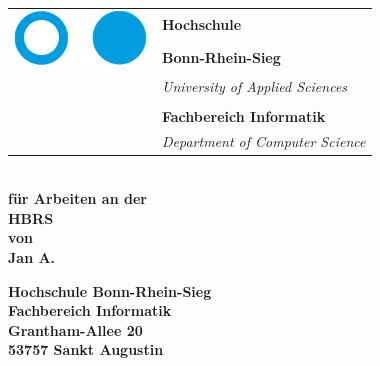 

\begin{titlepage}

    \begin{tabular}{ll}
         \multirow{2}{*}{\includegraphics[scale=0.37]{Bilder/HBRS_Logo_500px.png}} & \textbf{Hochschule}  \\
            & \textbf{Bonn-Rhein-Sieg} \\
            & \textit{University of Applied Sciences} \\ \\
            & \textbf{Fachbereich Informatik} \\
            & \textit{Department of Computer Science} \\
    \end{tabular}
    
    \begin{center}
        \vspace{3cm} 
        {\bf 
            {\Huge \ThesisTitle} \\ \vspace{0.4cm}
            {\Large für Arbeiten an der} \\ \vspace{0.4cm}
            {\Huge HBRS} \\ \vspace{0.4cm}
            {\Large von \\ Jan A.}
        }
        
        \vspace{2.5cm}
        \begin{Large} 
            {\bf
                Hochschule Bonn-Rhein-Sieg \\
                Fachbereich Informatik \\
                Grantham-Allee 20 \\
                53757 Sankt Augustin \\
            }
        \end{Large}
    \end{center}
\end{titlepage}
